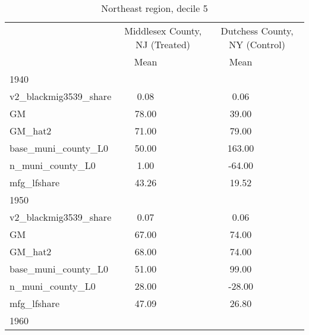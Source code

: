 \begin{table}[htbp]\centering
\def\sym#1{\ifmmode^{#1}\else\(^{#1}\)\fi}
\caption{Northeast region, decile 5 \label{tab1}}
\begin{tabular}{l*{2}{ccc}}
\toprule
                    &\multicolumn{3}{c}{Middlesex County, NJ (Treated)}&\multicolumn{3}{c}{Dutchess County, NY (Control)}\\
                    &        Mean&            &            &        Mean&            &            \\
\midrule
1940                &            &            &            &            &            &            \\
v2\_blackmig3539\_share&        0.08&            &            &        0.06&            &            \\
GM                  &       78.00&            &            &       39.00&            &            \\
GM\_hat2             &       71.00&            &            &       79.00&            &            \\
base\_muni\_county\_L0 &       50.00&            &            &      163.00&            &            \\
n\_muni\_county\_L0    &        1.00&            &            &      -64.00&            &            \\
mfg\_lfshare         &       43.26&            &            &       19.52&            &            \\
\midrule
1950                &            &            &            &            &            &            \\
v2\_blackmig3539\_share&        0.07&            &            &        0.06&            &            \\
GM                  &       67.00&            &            &       74.00&            &            \\
GM\_hat2             &       68.00&            &            &       74.00&            &            \\
base\_muni\_county\_L0 &       51.00&            &            &       99.00&            &            \\
n\_muni\_county\_L0    &       28.00&            &            &      -28.00&            &            \\
mfg\_lfshare         &       47.09&            &            &       26.80&            &            \\
\midrule
1960                &            &            &            &            &            &            \\

\end{tabular}
\end{table}
